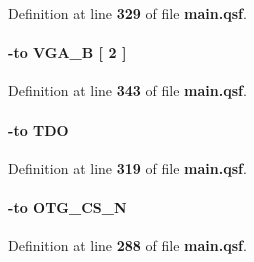 Definition at line {\bf 329} of file {\bf main.\+qsf}.

\paragraph[{P\+I\+N\+\_\+\+F12}]{ {\bfseries \textcolor{vhdlchar}{-\/}\textcolor{keywordflow}{to}\textcolor{vhdlchar}{ }\textcolor{vhdlchar}{V\+G\+A\+\_\+B}\textcolor{vhdlchar}{ }\textcolor{vhdlchar}{[}\textcolor{vhdlchar}{ } \textcolor{vhdldigit}{2} \textcolor{vhdlchar}{ }\textcolor{vhdlchar}{]}\textcolor{vhdlchar}{ }}\hspace{0.3cm}{\ttfamily [Constraints]}}\label{main_8qsf_a6e461b477f2121318f16059958ce0a07}


Definition at line {\bf 343} of file {\bf main.\+qsf}.

\paragraph[{P\+I\+N\+\_\+\+F14}]{ {\bfseries \textcolor{vhdlchar}{-\/}\textcolor{keywordflow}{to}\textcolor{vhdlchar}{ }\textcolor{vhdlchar}{T\+DO}\textcolor{vhdlchar}{ }}\hspace{0.3cm}{\ttfamily [Constraints]}}\label{main_8qsf_a9ccc9c424437a233989f0709f65d49b0}


Definition at line {\bf 319} of file {\bf main.\+qsf}.

\paragraph[{P\+I\+N\+\_\+\+F1}]{ {\bfseries \textcolor{vhdlchar}{-\/}\textcolor{keywordflow}{to}\textcolor{vhdlchar}{ }\textcolor{vhdlchar}{O\+T\+G\+\_\+\+C\+S\+\_\+N}\textcolor{vhdlchar}{ }}\hspace{0.3cm}{\ttfamily [Constraints]}}\label{main_8qsf_a6fc1b766d334ca79c8d4bac0cf07c104}


Definition at line {\bf 288} of file {\bf main.\+qsf}.

